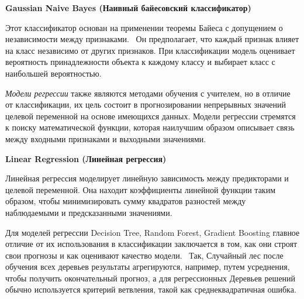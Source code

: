 \textbf{Gaussian Naive Bayes (Наивный байесовский классификатор)}

Этот классификатор основан на применении теоремы Байеса с допущением о независимости между признаками.~\cite{Zhang2004} Он предполагает, что каждый признак влияет на класс независимо от других признаков. При классификации модель оценивает вероятность принадлежности объекта к каждому классу и выбирает класс с наибольшей вероятностью.

\textit{Модели регрессии} также являются методами обучения с учителем, но в отличие от классификации, их цель состоит в прогнозировании непрерывных значений целевой переменной на основе имеющихся данных. Модели регрессии стремятся к поиску математической функции, которая наилучшим образом описывает связь между входными признаками и выходными значениями.

\textbf{Linear Regression (Линейная регрессия) }

Линейная регрессия моделирует линейную зависимость между предикторами и целевой переменной. Она находит коэффициенты линейной функции таким образом, чтобы минимизировать сумму квадратов разностей между наблюдаемыми и предсказанными значениями.

Для моделей регрессии Decision Tree, Random Forest, Gradient Boosting главное отличие от их использования в классификации заключается в том, как они строят свои прогнозы и как оценивают качество модели.~\cite{Nunez2011} Так, Случайный лес после обучения всех деревьев результаты агрегируются, например, путем усреднения, чтобы получить окончательный прогноз, а для регрессионных Деревьев решений обычно используется критерий ветвления, такой как среднеквадратичная ошибка.
